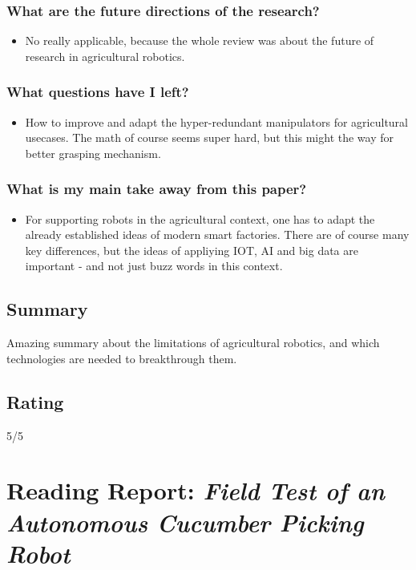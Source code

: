     \subsubsection*{What are the future directions of the research?}
    \begin{itemize}
        \item No really applicable, because the whole review was about the future of research in agricultural robotics.
    \end{itemize}
    \subsubsection*{What questions have I left?}
    \begin{itemize}
        \item How to improve and adapt the hyper-redundant manipulators for agricultural usecases. The math of course seems super hard, but this might the way for better grasping mechanism.
    \end{itemize}
    \subsubsection*{What is my main take away from this paper?}
    \begin{itemize}
        \item For supporting robots in the agricultural context, one has to adapt the already established ideas of modern smart factories. There are of course many key differences, but the ideas of appliying IOT, AI and big data are important  - and not just buzz words in this context.
    \end{itemize}
    
    \subsection*{Summary}
    Amazing summary about the limitations of agricultural robotics, and which technologies are needed to breakthrough them.
    
    \subsection*{Rating}
    5/5
    
    \newpage
    \section{Reading Report: \emph{Field Test of an Autonomous Cucumber Picking Robot}}
    \cite{Henten2003}
    
